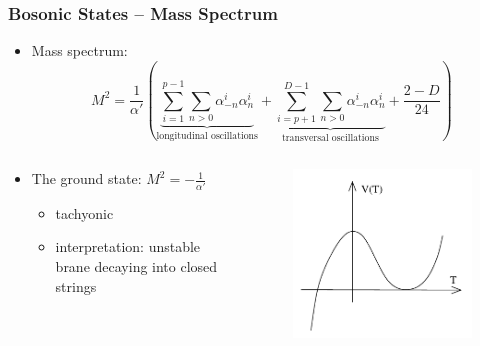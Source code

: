 \documentclass[aspectratio=169]{beamer}
\begin{document}
	\begin{frame}
		\frametitle{Bosonic States -- Mass Spectrum}
		\begin{itemize}
			\item Mass spectrum:
			\begin{equation*}
				M^2 = \frac{1}{\alpha'} \left( \underbrace{ \sum_{i=1}^{p-1}\sum_{n>0} \alpha^i_{-n}\alpha^i_{n}}_{\text{longitudinal oscillations}} + \underbrace{\sum_{i=p+1}^{D-1}\sum_{n>0} \alpha^i_{-n}\alpha^i_{n}}_{\text{transversal oscillations}} + \frac{2-D}{24} \right)
			\end{equation*}
		\end{itemize}
			\begin{columns}
			\begin{column}{0.7\textwidth}
				\begin{itemize}
				\item The ground state: $M^2 = - \frac{1}{\alpha'}$
					\begin{itemize}
						\item tachyonic
						\item interpretation: unstable brane decaying into closed strings
					\end{itemize}
				\end{itemize}
				\end{column}
				\begin{column}{0.3\textwidth}
					\begin{figure}
						\centering
						\includegraphics[width=0.7\linewidth]{res/tachyon_zero}
					\end{figure}
					
				\end{column}
			\end{columns}
	\end{frame}
\end{document}
